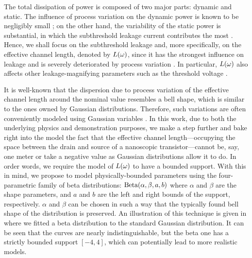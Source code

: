 The total dissipation of power is composed of two major parts: dynamic and static.
The influence of process variation on the dynamic power is known to be negligibly small \cite{srivastava2010, juan2011, juan2012}; on the other hand, the variability of the static power is substantial, in which the subthreshold leakage current contributes the most \cite{juan2011, juan2012}.
Hence, we shall focus on the subthreshold leakage and, more specifically, on the effective channel length, denoted by $L(\omega)$, since it has the strongest influence on leakage and is severely deteriorated by process variation \cite{chandrakasan2001}.
In particular, $L(\omega)$ also affects other leakage-magnifying parameters such as the threshold voltage \cite{juan2011}.

It is well-known that the dispersion due to process variation of the effective channel length around the nominal value resembles a bell shape, which is similar to the ones owned by Gaussian distributions.
Therefore, such variations are often conveniently modeled using Gaussian variables \cite{srivastava2010, juan2011, juan2012, chandra2010, shen2009, bhardwaj2006, ghanta2006}.
In this work, due to both the underlying physics and demonstration purposes, we make a step further and bake right into the model the fact that the effective channel length---occupying the space between the drain and source of a nanoscopic transistor---cannot be, say, one meter or take a negative value as Gaussian distributions allow it to do.
In order words, we require the model of $L(\omega)$ to have a bounded support.
With this in mind, we propose to model physically-bounded parameters using the four-parametric family of beta distributions: $\text{Beta}(\alpha, \beta, a, b)$ where $\alpha$ and $\beta$ are the shape parameters, and $a$ and $b$ are the left and right bounds of the support, respectively.
$\alpha$ and $\beta$ can be chosen in such a way that the typically found bell shape of the distribution is preserved.
An illustration of this technique is given in  where we fitted a beta distribution to the standard Gaussian distribution.
It can be seen that the curves are nearly indistinguishable, but the beta one has a strictly bounded support $[-4, 4]$, which can potentially lead to more realistic models.

